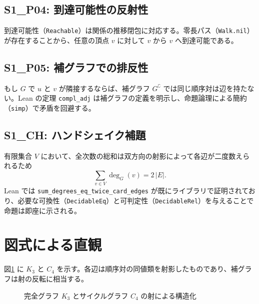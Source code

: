 \documentclass[a4paper]{ltjsarticle}
\theoremstyle{definition}
\theoremstyle{plain}
\begin{document}
\subsection*{S1\_P04: 到達可能性の反射性}
到達可能性（\verb|Reachable|）は関係の推移閉包に対応する。零長パス（\verb|Walk.nil|）が存在することから、任意の頂点 $v$ に対して $v$ から $v$ へ到達可能である。

\subsection*{S1\_P05: 補グラフでの排反性}
もし $G$ で $u$ と $v$ が隣接するならば、補グラフ $G^{\complement}$ では同じ順序対は辺を持たない。Lean の定理 \verb|compl_adj| は補グラフの定義を明示し、命題論理による簡約（\verb|simp|）で矛盾を回避する。

\subsection*{S1\_CH: ハンドシェイク補題}
有限集合 $V$ において、全次数の総和は双方向の射影によって各辺が二度数えられるため
\begin{equation}
  \sum_{v\in V} \deg_G(v) = 2\,|E|.
\end{equation}
Lean では \verb|sum_degrees_eq_twice_card_edges| が既にライブラリで証明されており、必要な可換性（\verb|DecidableEq|）と可判定性（\verb|DecidableRel|）を与えることで命題は即座に示される。

\section{図式による直観}
図\ref{fig:graphs} に $K_3$ と $C_4$ を示す。各辺は順序対の同値類を射影したものであり、補グラフは射の反転に相当する。

\begin{figure}[htbp]
  \centering
  \qquad
  \caption{完全グラフ $K_3$ とサイクルグラフ $C_4$ の射による構造化}
  \label{fig:graphs}
\end{figure}
\end{document}
